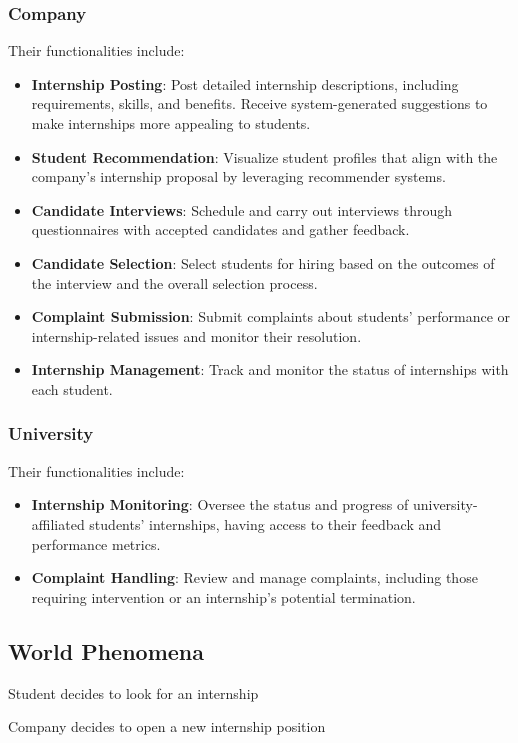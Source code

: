 \subsubsection*{Company}
Their functionalities  include:
\begin{itemize} 
    \item \textbf{Internship Posting}: Post detailed internship descriptions, including requirements, skills, and benefits. Receive system-generated suggestions to make internships more appealing to students.
    \item \textbf{Student Recommendation}: Visualize student profiles that align with the company's internship proposal by leveraging recommender systems.
    \item \textbf{Candidate Interviews}: Schedule and carry out interviews through questionnaires with accepted candidates and gather feedback.
    \item \textbf{Candidate Selection}: Select students for hiring based on the outcomes of the interview and the overall selection process.
    \item \textbf{Complaint Submission}: Submit complaints about students' performance or internship-related issues and monitor their resolution.
    \item \textbf{Internship Management}: Track and monitor the status of internships with each student.
\end{itemize}

\subsubsection*{University}
Their functionalities  include:
\begin{itemize} 
\item \textbf{Internship Monitoring}: Oversee the status and progress of university-affiliated students' internships, having access to their feedback and performance metrics.
\item \textbf{Complaint Handling}: Review and manage complaints, including those requiring intervention or an internship's potential termination.
\end{itemize}


\subsection{World Phenomena}
\begin{enumerate}[label={\textbf{[WP\arabic*]}}, leftmargin=1.52cm]
    \item Student decides to look for an internship 
    \item Company decides to open a new internship position 
\end{enumerate}

